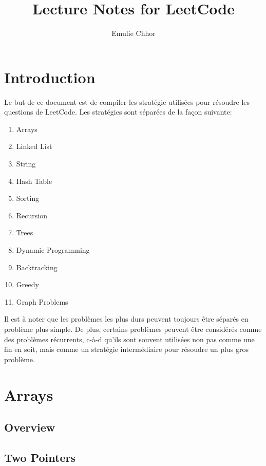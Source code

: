 \documentclass{article}
\begin{document}
\title{Lecture Notes for LeetCode}
\author{Emulie Chhor}
\maketitle

\section*{Introduction}

Le but de ce document est de compiler les stratégie utilisées pour
résoudre les questions de LeetCode. Les stratégies sont séparées de la
façon suivante:

    \begin{enumerate}
	\item Arrays
	\item Linked List
	\item String
	\item Hash Table
	\item Sorting
	\item Recursion
	\item Trees
	\item Dynamic Programming
	\item Backtracking
	\item Greedy
	\item Graph Problems
    \end{enumerate}

Il est à noter que les problèmes les plus durs peuvent toujours être
séparés en problème plus simple. De plus, certains problèmes peuvent
être considérés comme des problèmes récurrents, c-à-d qu'ils sont
souvent utilisées non pas comme une fin en soit, mais comme un stratégie
intermédiaire pour résoudre un plus gros problème.

\newtheorem{strategy}{Strategy}[subsection]
\newtheorem*{remark}{Remarque}
\newtheorem*{problem}{Problème}
\newtheorem*{intuition}{Intuition}

\section{Arrays}%
\label{sec:Arrays}

\subsection*{Overview}%
\label{sub:Overview}

\subsection{Two Pointers}%
\label{sub:Two Pointers}
\end{document}
